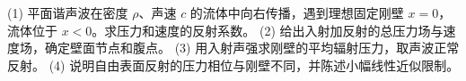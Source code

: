 (1) 平面谐声波在密度 \(\rho\)、声速 \(c\) 的流体中向右传播，遇到理想固定刚壁 \(x=0\)，流体位于 \(x<0\)。求压力和速度的反射系数。
(2) 给出入射加反射的总压力场与速度场，确定壁面节点和腹点。
(3) 用入射声强求刚壁的平均辐射压力，取声波正常反射。
(4) 说明自由表面反射的压力相位与刚壁不同，并陈述小幅线性近似限制。
